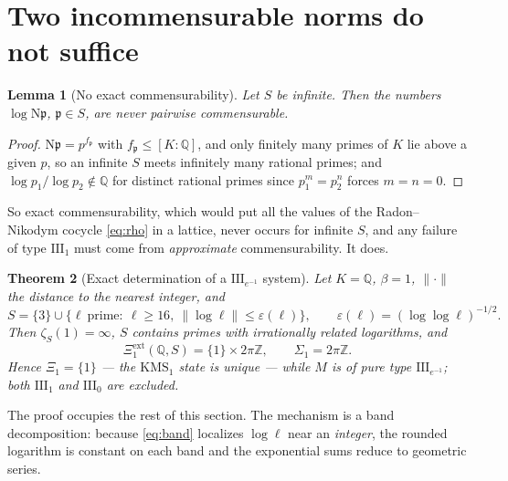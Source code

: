\documentclass[11pt]{amsart}
\numberwithin{equation}{section}
\newtheorem{theorem}{Theorem}[section]
\newtheorem{lemma}[theorem]{Lemma}
\theoremstyle{definition}
\theoremstyle{remark}
\newcommand{\Z}{\mathbb{Z}}
\newcommand{\Q}{\mathbb{Q}}
\newcommand{\pp}{\mathfrak{p}}
\newcommand{\Ns}{\mathrm{N}}
\begin{document}
\section{Two incommensurable norms do not suffice}\label{sec:counter}

\begin{lemma}[No exact commensurability]\label{lem:noexact}
Let $S$ be infinite. Then the numbers $\log\Ns\pp$, $\pp\in S$, are never pairwise
commensurable.
\end{lemma}

\begin{proof}
$\Ns\pp=p^{f_\pp}$ with $f_\pp\le[K:\Q]$, and only finitely many primes of $K$ lie above a
given $p$, so an infinite $S$ meets infinitely many rational primes; and
$\log p_1/\log p_2\notin\Q$ for distinct rational primes since $p_1^m=p_2^n$ forces $m=n=0$.
\end{proof}

So exact commensurability, which would put all the values of the Radon--Nikodym cocycle
\eqref{eq:rho} in a lattice, never occurs for infinite $S$, and any failure of type
$\mathrm{III}_1$ must come from \emph{approximate} commensurability. It does.

\begin{theorem}[Exact determination of a $\mathrm{III}_{e^{-1}}$ system]\label{thm:counter}
Let $K=\Q$, $\beta=1$, $\|\cdot\|$ the distance to the nearest integer, and
\begin{equation}\label{eq:band}
S=\{3\}\cup\bigl\{\ell\ \text{prime}:\ \ell\ge16,\ \|\log\ell\|\le\varepsilon(\ell)\bigr\},
\qquad\varepsilon(\ell)=(\log\log\ell)^{-1/2}.
\end{equation}
Then $\zeta_S(1)=\infty$, $S$ contains primes with irrationally related logarithms, and
\[
\Xi^{\mathrm{ext}}_1(\Q,S)=\{1\}\times2\pi\Z,\qquad \Sigma_1=2\pi\Z .
\]
Hence $\Xi_1=\{1\}$ --- the $\mathrm{KMS}_1$ state is \emph{unique} --- while $M$ is of pure
type $\mathrm{III}_{e^{-1}}$; both $\mathrm{III}_1$ and $\mathrm{III}_0$ are excluded.
\end{theorem}

The proof occupies the rest of this section. The mechanism is a band decomposition: because
\eqref{eq:band} localizes $\log\ell$ near an \emph{integer}, the rounded logarithm is
constant on each band and the exponential sums reduce to geometric series.
\end{document}
